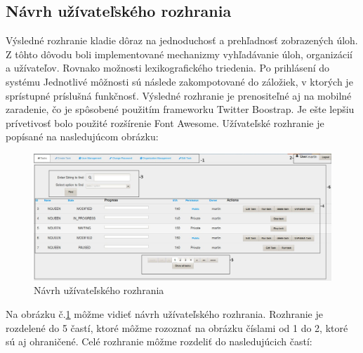 \subsection{Návrh užívateľského rozhrania}
Výsledné rozhranie kladie dôraz na jednoduchosť a prehľadnosť zobrazených úloh. Z tôhto dôvodu boli implementované mechanizmy vyhľadávanie úloh, organizácií a užívateľov. Rovnako možnosti lexikografického triedenia. Po prihlásení do systému Jednotlivé môžnosti sú následe zakompotované do záložiek, v ktorých je sprístupné príslušná funkčnosť. Výsledné rozhranie je prenositeľné aj na mobilné zaradenie, čo je spôsobené použitím frameworku Twitter Boostrap. Je ešte lepšiu prívetivosť bolo použité rozšírenie Font Awesome. Užívateľské rozhranie je popísané na nasledujúcom obrázku:
\begin{figure}[htb]

\begin{center}

\includegraphics[scale=0.5]{page_show.jpg} 
\caption{Návrh užívateľského rozhrania}
\label{rozhranie}

\end{center}

\end{figure}
Na obrázku č.\ref{rozhranie} môžme vidieť návrh užívateľského rozhrania. Rozhranie je rozdelené do 5 častí, ktoré môžme rozoznať na obrázku číslami od 1 do 2, ktoré sú aj ohraničené. Celé rozhranie môžme rozdeliť do nasledujúcich častí:
